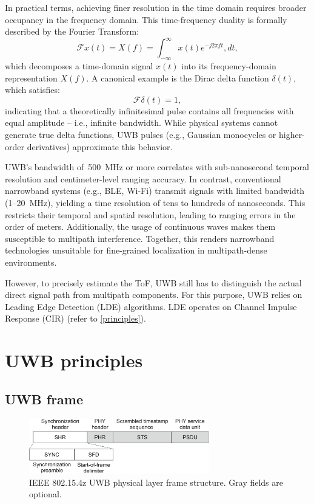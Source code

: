 In practical terms, achieving finer resolution in the time domain requires broader occupancy in the frequency domain. This time-frequency duality is formally described by the Fourier Transform:
\begin{equation} 
\mathcal{F}{x(t)} = X(f) = \int_{-\infty}^{\infty} x(t) e^{-j2\pi ft} , dt, 
\end{equation}
which decomposes a time-domain signal $x(t)$ into its frequency-domain representation $X(f)$. A canonical example is the Dirac delta function $\delta(t)$, which satisfies:
\begin{equation} \mathcal{F}{\delta(t)} = 1, \end{equation}
indicating that a theoretically infinitesimal pulse contains all frequencies with equal amplitude -- i.e., infinite bandwidth. While physical systems cannot generate true delta functions, UWB pulses (e.g., Gaussian monocycles or higher-order derivatives) approximate this behavior.

UWB's bandwidth of~\SI{500}{\mega\hertz} or more correlates with sub-nanosecond temporal resolution and centimeter-level ranging accuracy. In contrast, conventional narrowband systems (e.g., BLE, Wi-Fi) transmit signals with limited bandwidth (1–20~\si{\mega\hertz}), yielding a time resolution of tens to hundreds of nanoseconds. This restricts their temporal and spatial resolution, leading to ranging errors in the order of meters. Additionally, the usage of continuous waves makes them susceptible to multipath interference. Together, this renders narrowband technologies unsuitable for fine-grained localization in multipath-dense environments.

However, to precisely estimate the ToF, UWB still has to distinguish the actual direct signal path from multipath components. For this purpose, UWB relies on Leading Edge Detection (LDE) algorithms. LDE operates on Channel Impulse Response (CIR) (refer to \autoref{principles}).

\section{UWB principles}\label{principles}
\subsection{UWB frame}

\begin{figure}[tbh]
\includegraphics[width=0.7\textwidth]{Figures/theoretical_background/uwb_phy.pdf}
\centering
\caption{IEEE 802.15.4z UWB physical layer frame structure. Gray fields are optional.}
\label{fig:phy}
\end{figure}

